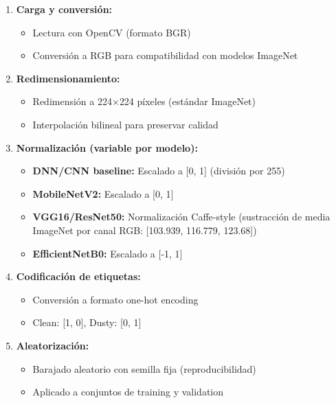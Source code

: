 \documentclass[11pt, a4paper]{article}
\begin{document}
\begin{enumerate}
    \item \textbf{Carga y conversión:}
    \begin{itemize}
        \item Lectura con OpenCV (formato BGR)
        \item Conversión a RGB para compatibilidad con modelos ImageNet
    \end{itemize}
    
    \item \textbf{Redimensionamiento:}
    \begin{itemize}
        \item Redimensión a 224$\times$224 píxeles (estándar ImageNet)
        \item Interpolación bilineal para preservar calidad
    \end{itemize}
    
    \item \textbf{Normalización (variable por modelo):}
    \begin{itemize}
        \item \textbf{DNN/CNN baseline:} Escalado a [0, 1] (división por 255)
        \item \textbf{MobileNetV2:} Escalado a [0, 1]
        \item \textbf{VGG16/ResNet50:} Normalización Caffe-style (sustracción de media ImageNet por canal RGB: [103.939, 116.779, 123.68])
        \item \textbf{EfficientNetB0:} Escalado a [-1, 1]
    \end{itemize}
    
    \item \textbf{Codificación de etiquetas:}
    \begin{itemize}
        \item Conversión a formato one-hot encoding
        \item Clean: [1, 0], Dusty: [0, 1]
    \end{itemize}
    
    \item \textbf{Aleatorización:}
    \begin{itemize}
        \item Barajado aleatorio con semilla fija (reproducibilidad)
        \item Aplicado a conjuntos de training y validation
    \end{itemize}
\end{enumerate}
\end{document}

